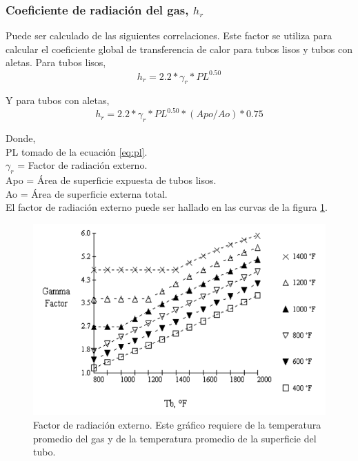\subsubsection{Coeficiente de radiación del gas, $h_r$}
\par Puede ser calculado de las siguientes correlaciones. Este factor se utiliza para calcular el coeficiente global de transferencia de calor para tubos lisos y tubos con aletas. 
Para tubos lisos,
\begin{equation*}
h_r = 2.2 *\gamma_r *PL^{0.50}
\end{equation*}

\par Y para tubos con aletas,
\begin{equation*}
h_r = 2.2 *\gamma_r *PL^{0.50} *(Apo/Ao) *0.75
\end{equation*}

\par Donde,\\
PL tomado de la ecuación \ref{eq:pl}.\\
$\gamma_r$ = Factor de radiación externo.\\
Apo = Área de superficie expuesta de tubos lisos.\\
Ao = Área de superficie externa total. \\

El factor de radiación externo puede ser hallado en las curvas de la figura \ref{fig:gamma}.

\begin{figure}[hbt]
\begin{center}
\includegraphics[scale=0.45]{images/gamma}
\caption[Factor de radiación externo]{Factor de radiación externo. Este gráfico requiere de la temperatura promedio del gas y de la temperatura promedio de la superficie del tubo.}
\label{fig:gamma}
\end{center}
\end{figure}